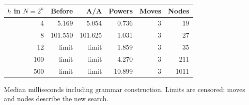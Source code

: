 \begin{center}\small
\begin{tabular}{@{}rrrrrr@{}}
\toprule
$h$ in $N=2^h$ & Before & A/A & Powers & Moves & Nodes \\
\midrule
4 & 5.169 & 5.054 & 0.736 & 3 & 19 \\
8 & 101.550 & 101.625 & 1.031 & 3 & 27 \\
12 & limit & limit & 1.859 & 3 & 35 \\
100 & limit & limit & 4.270 & 3 & 211 \\
500 & limit & limit & 10.899 & 3 & 1011 \\
\bottomrule
\end{tabular}
\end{center}
Median milliseconds including grammar construction. Limits are censored; moves and nodes describe the new search.
